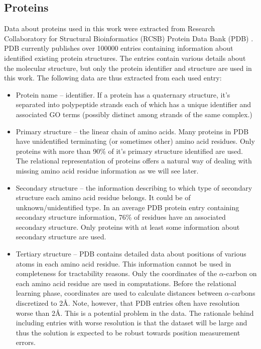\documentclass[11pt,twoside,a4paper]{book}
\begin{document}
\subsection{Proteins}
Data about proteins used in this work were extracted from Research Collaboratory for Structural Bioinformatics (RCSB) Protein Data Bank (PDB) \cite{pdb}.
PDB currently publishes over 100000 entries containing information about identified existing protein structures.
The entries contain various details about the molecular structure,
but only the protein identifier and structure are used in this work.
The following data are thus extracted from each used entry:
\begin{itemize}
 \item Protein name -- identifier. If a protein has a quaternary structure,
 it's separated into polypeptide strands each of which has a unique identifier and associated GO terms
 (possibly distinct among strands of the same complex.)
 \item Primary structure -- the linear chain of amino acids.
 Many proteins in PDB have unidentified terminating (or sometimes other) amino acid residues.
 Only proteins with more than 90\% of it's primary structure identified are used.
 The relational representation of proteins offers a natural way of dealing with missing amino
 acid residue information as we will see later.
 \item Secondary structure -- the information describing to which type of secondary structure each amino acid residue belongs.
 It could be of unknown/unidentified type. In an average PDB protein entry containing secondary structure information, 76\% of residues have an associated secondary structure.
 Only proteins with at least some information about secondary structure are used.
 \item Tertiary structure -- PDB contains detailed data about positions of various atoms in each amino acid residue.
 This information cannot be used in completeness for tractability reasons. 
 Only the coordinates of the $\alpha$-carbon on each amino acid residue are used in computations.
 Before the relational learning phase, coordinates are used to calculate distances between $\alpha$-carbons discretized to 2Å.
 Note, however, that PDB entries often have resolution worse than 2Å.
 This is a potential problem in the data.
 The rationale behind including entries with worse resolution is that the dataset will be large and thus the solution
 is expected to be robust towards position measurement errors.
\end{itemize}
\end{document}
